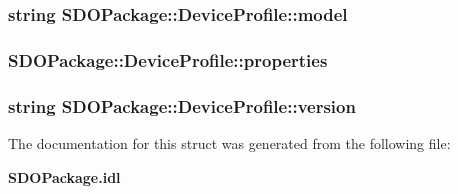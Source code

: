 \subsubsection[{model}]{\setlength{\rightskip}{0pt plus 5cm}string {\bf SDOPackage::DeviceProfile::model}}\label{structSDOPackage_1_1DeviceProfile_a36b90434d0fc86721269a418667af436}
\subsubsection[{properties}]{ {\bf SDOPackage::DeviceProfile::properties}}\label{structSDOPackage_1_1DeviceProfile_a6945952e1a03ed66975f8880ad66cc8b}
\subsubsection[{version}]{\setlength{\rightskip}{0pt plus 5cm}string {\bf SDOPackage::DeviceProfile::version}}\label{structSDOPackage_1_1DeviceProfile_adcf7a5ff087fb27effb546f9adcd9c1e}


The documentation for this struct was generated from the following file:\begin{DoxyCompactItemize}
\item 
{\bf SDOPackage.idl}\end{DoxyCompactItemize}
